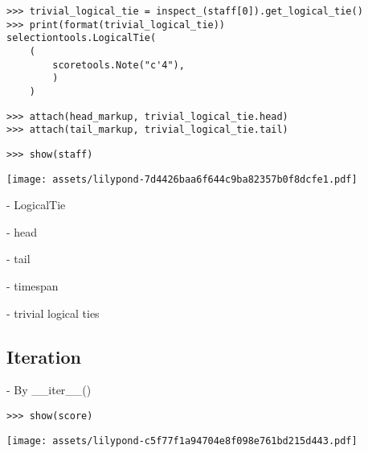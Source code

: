 \begin{abjadbookoutput}
\begin{singlespacing}
\vspace{-0.5\baselineskip}
\begin{lstlisting}
>>> trivial_logical_tie = inspect_(staff[0]).get_logical_tie()
>>> print(format(trivial_logical_tie))
selectiontools.LogicalTie(
    (
        scoretools.Note("c'4"),
        )
    )
\end{lstlisting}
\begin{lstlisting}
>>> attach(head_markup, trivial_logical_tie.head)
>>> attach(tail_markup, trivial_logical_tie.tail)
\end{lstlisting}
\end{singlespacing}
\end{abjadbookoutput}

\begin{comment}
<abjad>
show(staff)
</abjad>
\end{comment}

\begin{abjadbookoutput}
\begin{singlespacing}
\vspace{-0.5\baselineskip}
\begin{lstlisting}
>>> show(staff)
\end{lstlisting}
\noindent\texttt{[image: assets/lilypond-7d4426baa6f644c9ba82357b0f8dcfe1.pdf]}
\end{singlespacing}
\end{abjadbookoutput}

-   LogicalTie

    -   head

    -   tail

    -   timespan

    -   trivial logical ties

\subsection{Iteration}

-   By \_\_iter\_\_()

\begin{comment}
<abjad>
show(score)
</abjad>
\end{comment}

\begin{abjadbookoutput}
\begin{singlespacing}
\vspace{-0.5\baselineskip}
\begin{lstlisting}
>>> show(score)
\end{lstlisting}
\noindent\texttt{[image: assets/lilypond-c5f77f1a94704e8f098e761bd215d443.pdf]}
\end{singlespacing}
\end{abjadbookoutput}

